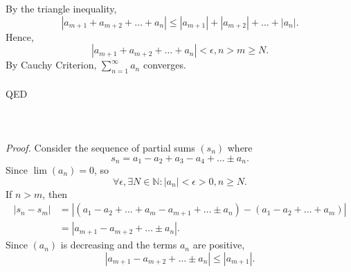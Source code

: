 \documentclass{article}
\begin{document}
            By the triangle inequality,
            \begin{equation*}
                |a_{m+1}+a_{m+2}+\dots+a_n| \leq |a_{m+1}| + |a_{m+2}| + \dots + |a_n|.
            \end{equation*}
            Hence,
            \begin{equation*}
                |a_{m+1}+a_{m+2}+\dots+a_n| < \epsilon, n > m \geq N.
            \end{equation*}
            By Cauchy Criterion, $\sum_{n=1}^\infty a_n$ converges.\\ \\
            QED\\ \\
            \\ \\
            \textit{Proof.} Consider the sequence of partial sums $(s_n)$ where
            \begin{equation*}
                s_n = a_1 - a_2 + a_3 - a_4 + \dots \pm a_n.
            \end{equation*}
            Since $\lim(a_n)=0$, so
            \begin{equation*}
                \forall \epsilon, \exists N \in \mathbb{N}: |a_n| < \epsilon > 0, n \geq N.
            \end{equation*}
            If $n>m$, then 
            \begin{align*}
                |s_n-s_m| & = |(a_1-a_2+\dots+a_m-a_{m+1}+\dots \pm a_n)-(a_1-a_2+\dots +a_m)| \\
                & = |a_{m+1}-a_{m+2}+\dots \pm a_n|.
            \end{align*}
            Since $(a_n)$ is decreasing and the terms $a_n$ are positive, 
            \begin{equation*}
                |a_{m+1}-a_{m+2}+\dots \pm a_n| \leq |a_{m+1}|.
            \end{equation*}
\end{document}
